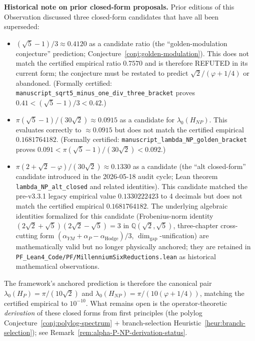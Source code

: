 \begin{observation}
\medskip
\noindent\textbf{Historical note on prior closed-form proposals.} Prior editions of this Observation discussed three closed-form candidates that have all been superseded:
\begin{itemize}
\item $(\sqrt{5}-1)/3 \approx 0.4120$ as a candidate ratio (the ``golden-modulation conjecture'' prediction; Conjecture~\ref{conj:golden-modulation}). This does not match the certified empirical ratio $0.7570$ and is therefore REFUTED in its current form; the conjecture must be restated to predict $\sqrt{2}/(\varphi+1/4)$ or abandoned. (Formally certified: \texttt{manuscript\_sqrt5\_minus\_one\_div\_three\_bracket} proves $0.41 < (\sqrt{5}-1)/3 < 0.42$.)
\item $\pi(\sqrt{5}-1)/(30\sqrt{2}) \approx 0.0915$ as a candidate for $\lambda_0(H_{NP})$. This evaluates correctly to $\approx 0.0915$ but does not match the certified empirical $0.1681764182$. (Formally certified: \texttt{manuscript\_lambda\_NP\_golden\_bracket} proves $0.091 < \pi(\sqrt{5}-1)/(30\sqrt{2}) < 0.092$.)
\item $\pi(2+\sqrt{2}-\varphi)/(30\sqrt{2}) \approx 0.1330$ as a candidate (the ``alt closed-form'' candidate introduced in the 2026-05-18 audit cycle; Lean theorem \texttt{lambda\_NP\_alt\_closed} and related identities). This candidate matched the pre-v3.3.1 legacy empirical value $0.1330222423$ to 4 decimals but does not match the certified empirical $0.1681764182$. The underlying algebraic identities formalized for this candidate (Frobenius-norm identity $(2\sqrt{2}+\sqrt{5})(2\sqrt{2}-\sqrt{5}) = 3$ in $\mathbb{Q}(\sqrt{2},\sqrt{5})$, three-chapter cross-cutting form $(α_{YM} + α_P - α_{\mathrm{Hodge}})/3$, $\dim_{\mathrm{gap}}$-unification) are mathematically valid but no longer physically anchored; they are retained in \texttt{PF\_Lean4\_Code/PF/MillenniumSixReductions.lean} as historical mathematical observations.
\end{itemize}

\medskip
\noindent The framework's anchored prediction is therefore the canonical pair $\lambda_0(H_P) = \pi/(10\sqrt{2})$ and $\lambda_0(H_{NP}) = \pi/(10(\varphi+1/4))$, matching the certified empirical to $10^{-10}$. What remains open is the operator-theoretic \emph{derivation} of these closed forms from first principles (the polylog Conjecture~\ref{conj:polylog-spectrum} + branch-selection Heuristic~\ref{heur:branch-selection}); see Remark~\ref{rem:alpha-P-NP-derivation-status}.
\end{observation}

